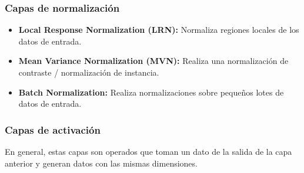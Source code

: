 \documentclass[a4paper, 12pt, oneside]{book}
\begin{document}
\subsubsection{Capas de normalización}

\begin{itemize}
\item \textbf{Local Response Normalization (LRN):} Normaliza regiones locales de los datos de entrada.
\item \textbf{Mean Variance Normalization (MVN):} Realiza una normalización de contraste / normalización de instancia.
\item \textbf{Batch Normalization:} Realiza normalizaciones sobre pequeños lotes de datos de entrada.
\end{itemize}

\subsubsection{Capas de activación}\label{CapasActivacion}

En general, estas capas son operados que toman un dato de la salida de la capa anterior y generan datos con las mismas dimensiones.
\\\\
\end{document}
